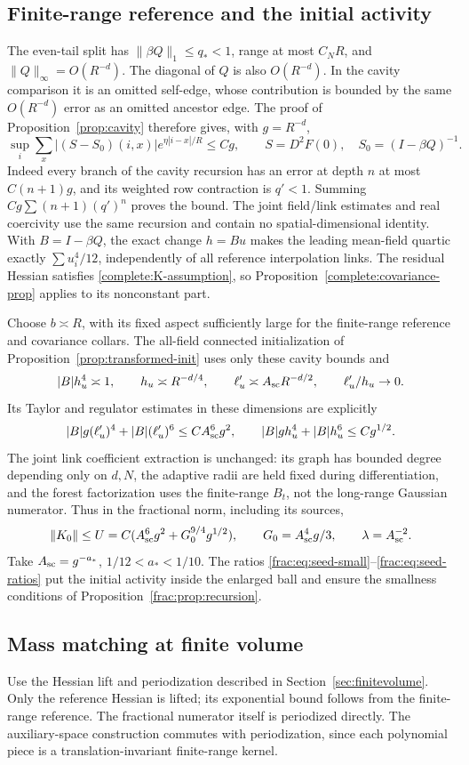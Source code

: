 \documentclass[11pt]{article}
\begin{document}
\subsection{Finite-range reference and the initial activity}
The even-tail split has
\(\|\beta Q\|_1\le q_*<1\), range at most \(C_NR\), and
\(\|Q\|_\infty=O(R^{-d})\). The diagonal of \(Q\) is also
\(O(R^{-d})\). In the cavity comparison it is an omitted self-edge,
whose contribution is bounded by the same \(O(R^{-d})\) error as
an omitted ancestor edge. The proof of Proposition~\ref{prop:cavity}
therefore gives, with \(g=R^{-d}\),
\[
 \sup_i\sum_x |(S-S_0)(i,x)|e^{\eta|i-x|/R}\le Cg,
 \qquad S=D^2F(0),\quad S_0=(I-\beta Q)^{-1}.
\]
Indeed every branch of the cavity recursion has an error at depth
\(n\) at most \(C(n+1)g\), and its weighted row contraction is
\(q'<1\). Summing \(Cg\sum(n+1)(q')^n\) proves the bound.
The joint field/link estimates and real coercivity use the same
recursion and contain no spatial-dimensional identity. With
\(B=I-\beta Q\), the exact change \(h=Bu\) makes the leading
mean-field quartic exactly \(\sum u_i^4/12\), independently of
all reference interpolation links. The residual Hessian satisfies
\eqref{complete:K-assumption}, so Proposition~\ref{complete:covariance-prop}
applies to its nonconstant part.

Choose \(b\asymp R\), with its fixed aspect sufficiently large
for the finite-range reference and covariance collars. The all-field
connected initialization of Proposition~\ref{prop:transformed-init}
uses only these cavity bounds and
\[
 |B|h_u^4\asymp1,\qquad h_u\asymp R^{-d/4},\qquad
 \ell'_u\asymp A_{\rm sc}R^{-d/2},\qquad \ell'_u/h_u\to0.
\]
Its Taylor and regulator estimates in these dimensions are explicitly
\[
 |B|g(\ell'_u)^4+|B|(\ell'_u)^6
       \le C A_{\rm sc}^6g^2,
 \qquad |B|g h_u^4+|B|h_u^6\le Cg^{1/2}.
\]
The joint link coefficient extraction is unchanged: its graph has
bounded degree depending only on \(d,N\), the adaptive radii are held
fixed during differentiation, and the forest factorization uses the
finite-range \(B_t\), not the long-range Gaussian numerator. Thus
in the fractional norm, including its sources,
\[
 \|K_0\|\le U=C(A_{\rm sc}^6g^2+G_0^{9/4}g^{1/2}),\qquad
 G_0=A_{\rm sc}^4g/3,\qquad \lambda=A_{\rm sc}^{-2}.
\]
Take \(A_{\rm sc}=g^{-a_*}\), \(1/12<a_*<1/10\).
The ratios \eqref{frac:eq:seed-small}--\eqref{frac:eq:seed-ratios}
put the initial activity inside the enlarged ball and ensure the
smallness conditions of Proposition~\ref{frac:prop:recursion}.

\subsection{Mass matching at finite volume}
Use the Hessian lift and periodization described in
Section~\ref{sec:finitevolume}. Only the reference Hessian is lifted;
its exponential bound follows from the finite-range reference. The
fractional numerator itself is periodized directly. The auxiliary-space
construction commutes with periodization, since each polynomial
piece is a translation-invariant finite-range kernel.
\end{document}
